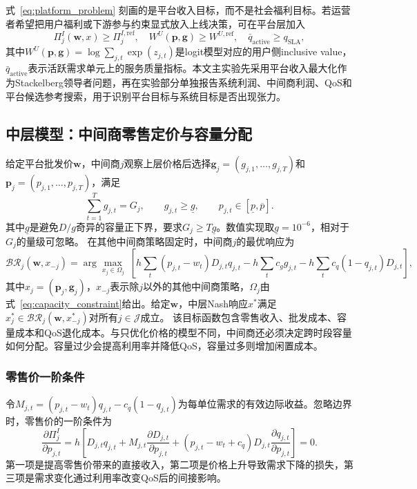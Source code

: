 \documentclass[UTF8,11pt]{ctexart}
\newcommand{\J}{\mathcal{J}}
\newcommand{\D}{D}
\newcommand{\w}{\boldsymbol{w}}
\newcommand{\p}{\boldsymbol{p}}
\newcommand{\g}{\boldsymbol{g}}
\begin{document}
式~\eqref{eq:platform_problem} 刻画的是平台收入目标，而不是社会福利目标。若运营者希望把用户福利或下游参与约束显式放入上线决策，可在平台层加入
\begin{equation}
  \Pi^I_j(\w,x)\ge \Pi^{I,\mathrm{ref}}_j,\quad
  W^U(\p,\g)\ge W^{U,\mathrm{ref}},\quad
  \bar q_{\mathrm{active}}\ge q_{\mathrm{SLA}},
  \label{eq:deployment_constraints}
\end{equation}
其中$W^U(\p,\g)=\log\sum_{j,t}\exp(z_{j,t})$是logit模型对应的用户侧inclusive value，$\bar q_{\mathrm{active}}$表示活跃需求单元上的服务质量指标。本文主实验先采用平台收入最大化作为Stackelberg领导者问题，再在实验部分单独报告系统利润、中间商利润、QoS和平台候选参考搜索，用于识别平台目标与系统目标是否出现张力。

\subsection{中层模型：中间商零售定价与容量分配}
\label{sec:middle_intermediary}

给定平台批发价$\w$，中间商$j$观察上层价格后选择$\g_j=(g_{j,1},\ldots,g_{j,T})$和$\p_j=(p_{j,1},\ldots,p_{j,T})$，满足
\begin{equation}
  \sum_{t=1}^{T}g_{j,t}=G_j,\qquad g_{j,t}\ge \underline g,\qquad
  p_{j,t}\in[\underline p,\overline p].
  \label{eq:capacity_constraint}
\end{equation}
其中$\underline g$是避免$D/g$奇异的容量正下界，要求$G_j\ge T\underline g$。数值实现取$\underline g=10^{-6}$，相对于$G_j$的量级可忽略。
在其他中间商策略固定时，中间商$j$的最优响应为
\begin{equation}
  \mathcal{BR}_j(\w,x_{-j})=
  \arg\max_{x_j\in\Omega_j}\;
  \left[
  h\sum_{t}(p_{j,t}-w_t)\D_{j,t}q_{j,t}
  -h\sum_t c_g g_{j,t}
  -h\sum_t c_q(1-q_{j,t})\D_{j,t}
  \right],
  \label{eq:broker_problem}
\end{equation}
其中$x_j=(\p_j,\g_j)$，$x_{-j}$表示除$j$以外的其他中间商策略，$\Omega_j$由式~\eqref{eq:capacity_constraint}给出。给定$\w$，中层Nash响应$x^*$满足$x_j^*\in\mathcal{BR}_j(\w,x_{-j}^*)$对所有$j\in\J$成立。
该目标函数包含零售收入、批发成本、容量成本和QoS退化成本。与只优化价格的模型不同，中间商还必须决定跨时段容量如何分配。容量过少会提高利用率并降低QoS，容量过多则增加闲置成本。

\subsubsection{零售价一阶条件}

令$M_{j,t}=(p_{j,t}-w_t)q_{j,t}-c_q(1-q_{j,t})$为每单位需求的有效边际收益。忽略边界时，零售价的一阶条件为
\begin{equation}
  \frac{\partial\Pi^I_j}{\partial p_{j,t}}
  =h\left[
  \D_{j,t}q_{j,t}
  +M_{j,t}\frac{\partial \D_{j,t}}{\partial p_{j,t}}
  +(p_{j,t}-w_t+c_q)\D_{j,t}\frac{\partial q_{j,t}}{\partial p_{j,t}}
  \right]=0.
  \label{eq:retail_foc}
\end{equation}
第一项是提高零售价带来的直接收入，第二项是价格上升导致需求下降的损失，第三项是需求变化通过利用率改变QoS后的间接影响。
\end{document}
